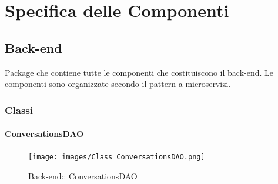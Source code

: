 \section{Specifica delle Componenti}
\subsection{Back-end}
Package che contiene tutte le componenti che costituiscono il back-end. Le componenti sono organizzate secondo il pattern a microservizi.
\subsubsection{Classi}
\hypertarget{ ConversationsDAO_label}{\paragraph{ ConversationsDAO}}
\begin{figure}[h]
	\centering
	\texttt{[image: images/Class ConversationsDAO.png]}
	\caption{Back-end:: ConversationsDAO}
\end{figure}
